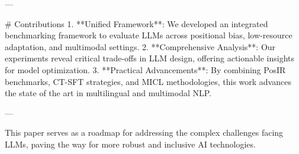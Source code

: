 ---

# Contributions  
1. **Unified Framework**: We developed an integrated benchmarking framework to evaluate LLMs across positional bias, low-resource adaptation, and multimodal settings.  
2. **Comprehensive Analysis**: Our experiments reveal critical trade-offs in LLM design, offering actionable insights for model optimization.  
3. **Practical Advancements**: By combining PosIR benchmarks, CT-SFT strategies, and MICL methodologies, this work advances the state of the art in multilingual and multimodal NLP.  

--- 

This paper serves as a roadmap for addressing the complex challenges facing LLMs, paving the way for more robust and inclusive AI technologies.